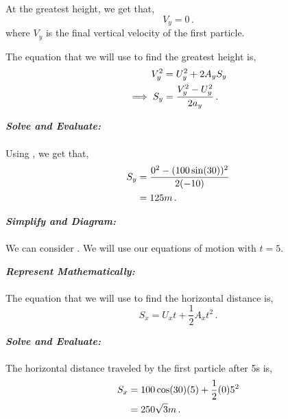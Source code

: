 \begin{subquestions}
At the greatest height, we get that,
\begin{equation}
	V_y = 0 \,.
\end{equation}
where $V_y$ is the final vertical velocity of the first particle.

The equation that we will use to find the greatest height is,
\begin{align}
	V_y^2 & = U_y^2 + 2A_yS_y \nonumber \\
	\implies S_y & = \frac{V_y^2-U_y^2}{2a_y} \label{2008J:q6:SEqn1} \,.
\end{align}




\textbf{\textit{Solve and Evaluate:}} \\ \\
Using , we get that,
\begin{align}
	S_y & = \frac{0^2-(100\sin(30))^2}{2(-10)} \nonumber \\
		& = 125m \,.
\end{align}


\subquestion

\begin{subsubquestions}
	
\subsubquestion

\textbf{\textit{Simplify and Diagram:}} \\ \\
We can consider . We will use our equations of motion with $t=5$.




\textbf{\textit{Represent Mathematically:}} \\ \\			
The equation that we will use to find the horizontal distance is,
\begin{equation}
	S_x =U_xt + \frac{1}{2}A_xt^2 \,.	
\end{equation}




\textbf{\textit{Solve and Evaluate:}} \\ \\
The horizontal distance traveled by the first particle after 5s is,
\begin{align}
	S_x & = 100\cos(30)(5) + \frac{1}{2}(0)5^2 \nonumber \\
	    & = 250\sqrt{3}m \,.
\end{align}


\end{subsubquestions}
\end{subquestions}
